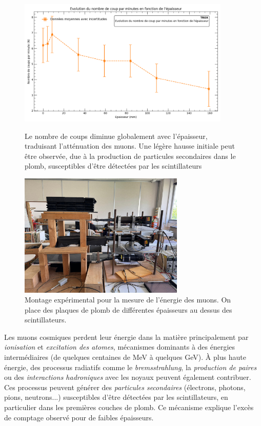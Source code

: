 \documentclass[a4paper,12pt,twoside]{article}
\begin{document}
\begin{figure}[!h]
  \begin{minipage}
  {0.49\textwidth}
  \centering
  \includegraphics[width=0.9\textwidth]{Images/energie.png}
  \caption{Le nombre de coups diminue globalement avec l’épaisseur, traduisant l’atténuation des muons. Une légère hausse initiale peut être observée, due à la production de particules secondaires dans le plomb, susceptibles d’être détectées par les scintillateurs }

  \label{fig:energie_1}
  \end{minipage}
  \hfill
  \begin{minipage}{0.45\textwidth}
  \centering
  \includegraphics[width=0.7\textwidth]{Images/plomb.jpg}
  \caption{Montage expérimental pour la mesure de l’énergie des muons. On place des plaques de plomb de différentes épaisseurs au dessus des scintillateurs.}
  \label{fig:energie_2}
  \end{minipage}
  \end{figure}
Les muons cosmiques perdent leur énergie dans la matière principalement par \textit{ionisation} et \textit{excitation des atomes}, mécanismes dominants à des énergies intermédiaires (de quelques centaines de MeV à quelques GeV). À plus haute énergie, des processus radiatifs comme le \textit{bremsstrahlung}, la \textit{production de paires} ou des \textit{interactions hadroniques} avec les noyaux peuvent également contribuer. Ces processus peuvent générer des \textit{particules secondaires} (électrons, photons, pions, neutrons...) susceptibles d’être détectées par les scintillateurs, en particulier dans les premières couches de plomb. Ce mécanisme explique l’excès de comptage observé pour de faibles épaisseurs.
\end{document}
